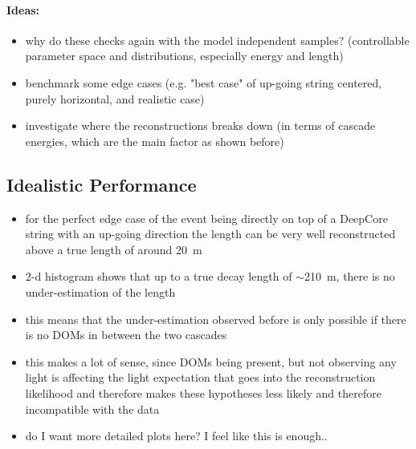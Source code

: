 \paragraph{Ideas:}
\begin{itemize}
    \item why do these checks again with the model independent samples? (controllable parameter space and distributions, especially energy and length)
    \item benchmark some edge cases (e.g. "best case" of up-going string centered, purely horizontal, and realistic case)
    \item investigate where the reconstructions breaks down (in terms of cascade energies, which are the main factor as shown before)
\end{itemize}

\subsection{Idealistic Performance}

\begin{itemize}
    \item for the perfect edge case of the event being directly on top of a DeepCore string with an up-going direction the length can be very well reconstructed above a true length of around \SI{20}{\meter}
    \item 2-d histogram shows that up to a true decay length of $\sim$\SI{210}{\meter}, there is no under-estimation of the length
    \item this means that the under-estimation observed before is only possible if there is no DOMs in between the two cascades
    \item this makes a lot of sense, since DOMs being present, but not observing any light is affecting the light expectation that goes into the reconstruction likelihood and therefore makes these hypotheses less likely and therefore incompatible with the data
    \item do I want more detailed plots here? I feel like this is enough.. 
\end{itemize}


